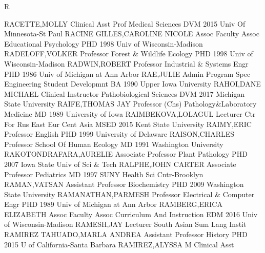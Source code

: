 \documentclass[
]{article}
\begin{document}
R

\textbar{}

RACETTE,MOLLY \textbar Clinical Asst Prof \textbar Medical Sciences
\textbar{}  \textbar DVM 2015 Univ Of Minnesota-St Paul
\textbar RACINE GILLES,CAROLINE NICOLE \textbar Assoc Faculty Assoc
\textbar Educational Psychology \textbar{}  \textbar PHD
1998 Univ of Wisconsin-Madison \textbar RADELOFF,VOLKER
\textbar Professor \textbar Forest \& Wildlife Ecology \textbar{}
 \textbar PHD 1998 Univ of Wisconsin-Madison
\textbar RADWIN,ROBERT \textbar Professor \textbar Industrial \& Systems
Engr \textbar{}  \textbar PHD 1986 Univ of Michigan at Ann
Arbor \textbar RAE,JULIE \textbar Admin Program Spec
\textbar Engineering Student Developmnt \textbar{} 
\textbar BA 1990 Upper Iowa University \textbar RAHOI,DANE MICHAEL
\textbar Clinical Instructor \textbar Pathobiological Sciences
\textbar{}  \textbar DVM 2017 Michigan State University
\textbar RAIFE,THOMAS JAY \textbar Professor (Chs)
\textbar Pathology\&Laboratory Medicine \textbar{} 
\textbar MD 1989 University of Iowa \textbar RAIMBEKOVA,LOLAGUL
\textbar Lecturer \textbar Ctr For Rus East Eur Cent Asia \textbar{}
 \textbar MSED 2015 Kent State University
\textbar RAIMY,ERIC \textbar Professor \textbar English \textbar{}
 \textbar PHD 1999 University of Delaware
\textbar RAISON,CHARLES \textbar Professor \textbar School Of Human
Ecology \textbar{}  \textbar MD 1991 Washington University
\textbar RAKOTONDRAFARA,AURELIE \textbar Associate Professor
\textbar Plant Pathology \textbar{}  \textbar PHD 2007 Iowa
State Univ of Sci \& Tech \textbar RALPHE,JOHN CARTER \textbar Associate
Professor \textbar Pediatrics \textbar{}  \textbar MD 1997
SUNY Health Sci Cntr-Brooklyn \textbar RAMAN,VATSAN \textbar Assistant
Professor \textbar Biochemistry \textbar{}  \textbar PHD
2009 Washington State University \textbar RAMANATHAN,PARMESH
\textbar Professor \textbar Electrical \& Computer Engr \textbar{}
 \textbar PHD 1989 Univ of Michigan at Ann Arbor
\textbar RAMBERG,ERICA ELIZABETH \textbar Assoc Faculty Assoc
\textbar Curriculum And Instruction \textbar{}  \textbar EDM
2016 Univ of Wisconsin-Madison \textbar RAMESH,JAY \textbar Lecturer
\textbar South Asian Sum Lang Instit \textbar{} 
\textbar RAMIREZ TAHUADO,MARLA ANDREA \textbar Assistant Professor
\textbar History \textbar PHD 2015 U of California-Santa Barbara
\textbar{}  \textbar RAMIREZ,ALYSSA M \textbar Clinical Asst
\end{document}
